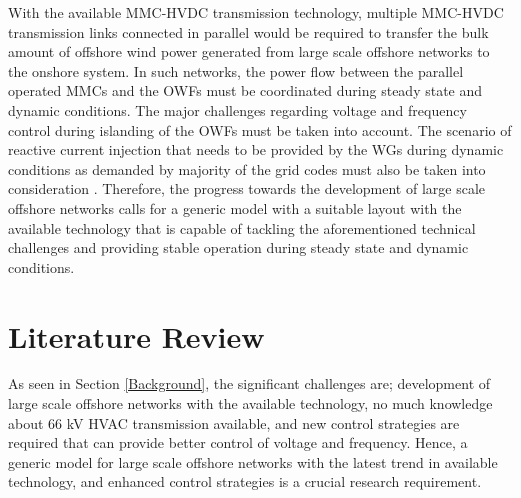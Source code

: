 With the available \gls{MMC}-\gls{HVDC} transmission technology, multiple \gls{MMC}-\gls{HVDC} transmission links connected in parallel would be required to transfer the bulk amount of offshore wind power generated from large scale offshore networks to the onshore system. In such networks, the power flow between the parallel operated \gls{MMC}s and the \gls{OWF}s must be coordinated during steady state and dynamic conditions. The major challenges regarding voltage and frequency control during islanding of the \gls{OWF}s must be taken into account. The scenario of reactive current injection that needs to be provided by the \gls{WG}s during dynamic conditions as demanded by majority of the grid codes must also be taken into consideration \cite{mohseni_review_2012}. Therefore, the progress towards the development of large scale offshore networks calls for a generic model with a suitable layout with the available technology that is capable of tackling the aforementioned technical challenges and providing stable operation during steady state and dynamic conditions. 


\section{Literature Review}\label{lit_review}

As seen in Section \ref{Background}, the significant challenges are; development of large scale offshore networks with the available technology, no much knowledge about 66 kV \gls{HVAC} transmission available, and new control strategies are required that can provide better control of voltage and frequency. Hence, a generic model for large scale offshore networks with the latest trend in available technology, and enhanced control strategies is a crucial research requirement. 


